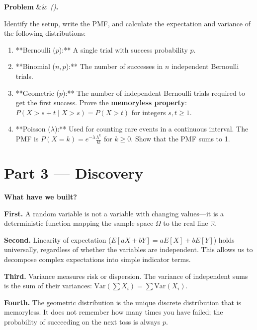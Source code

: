 \documentclass[12pt, a4paper]{article}
\newcounter{problem}
\newenvironment{problem}[1][]{%
  \refstepcounter{problem}%
  \par\vspace{6pt}%
  \noindent\textbf{\color{MidBlue}Problem \theproblem}%
  \ifx&#1&\else\ \textit{(#1)}\fi\textbf{.}\enskip
}{\par\vspace{4pt}}
\begin{document}
\begin{problem}
\label{prob:distributions}
Identify the setup, write the PMF, and calculate the expectation and variance of the following distributions:
\begin{enumerate}[label=(\alph*), topsep=2pt]
  \item **Bernoulli ($p$):** A single trial with success probability $p$.
  \item **Binomial ($n, p$):** The number of successes in $n$ independent Bernoulli trials.
  \item **Geometric ($p$):** The number of independent Bernoulli trials required to get the first success. Prove the \textbf{memoryless property}: $P(X > s + t \mid X > s) = P(X > t)$ for integers $s, t \ge 1$.
  \item **Poisson ($\lambda$):** Used for counting rare events in a continuous interval. The PMF is $P(X = k) = e^{-\lambda} \frac{\lambda^k}{k!}$ for $k \ge 0$. Show that the PMF sums to 1.
\end{enumerate}
\end{problem}

\newpage

\section{Part 3 \texorpdfstring{---}{--} Discovery}

\begin{discoverybox}
\textbf{What have we built?}

\textbf{First.} A random variable is not a variable with changing values—it is a deterministic function mapping the sample space $\Omega$ to the real line $\mathbb{R}$.

\textbf{Second.} Linearity of expectation ($E[aX+bY] = aE[X]+bE[Y]$) holds universally, regardless of whether the variables are independent. This allows us to decompose complex expectations into simple indicator terms.

\textbf{Third.} Variance measures risk or dispersion. The variance of independent sums is the sum of their variances: $\text{Var}(\sum X_i) = \sum \text{Var}(X_i)$.

\textbf{Fourth.} The geometric distribution is the unique discrete distribution that is memoryless. It does not remember how many times you have failed; the probability of succeeding on the next toss is always $p$.
\end{discoverybox}
\end{document}
